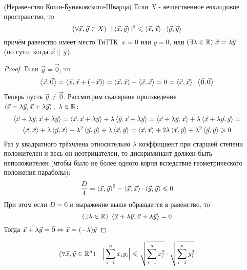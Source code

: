 \begin{theorem} (Неравенство Коши-Буняковского-Шварца) \label{Cauchy–Schwarz}
	Если $X$ - вещественное евклидовое пространство, то
	\[
		(\forall \vec{x}, \vec{y} \in X)\ \ 
		|\trbr{\vec{x}, \vec{y}}|^2 \le
		\trbr{\vec{x}, \vec{x}} \cdot
		\trbr{\vec{y}, \vec{y}}
	\]
	причём равенство имеет место ТиТТК $\ x = 0$ или $y = 0$, или
	$(\exists \lambda \in \mathbb{R})\ \vec{x} =
	\lambda \vec{y}\ $ (по сути, когда $\vec{x}\ ||\ \vec{y}$).
\end{theorem}

\begin{proof}
	Если $\vec{y} = \vec{0}$, то
	\[
		\left\langle\vec{x}, \vec{0}\right\rangle = \left\langle\vec{x},
		\vec{x} + (-\vec{x})\right\rangle = \left\langle\vec{x}, \vec{x}\right\rangle - 
		\left\langle\vec{x}, \vec{x}\right\rangle = 0 = \left\langle\vec{x}, \vec{x}\right\rangle
		\cdot \left\langle\vec{0}, \vec{0}\right\rangle
	\]
	Теперь пусть $\vec{y} \neq \vec{0}$.
	Рассмотрим скалярное произведение
	$\left\langle\vec{x} + \lambda \vec{y},
	\vec{x} + \lambda \vec{y}\right\rangle,\ \lambda \in \mathbb{R}$:
	\begin{multline*}
		\left\langle\vec{x} + \lambda \vec{y},
		\vec{x} + \lambda \vec{y}\right\rangle =
		\left\langle\vec{x}, \vec{x} + \lambda\vec{y}\right\rangle +
		\lambda\left\langle\vec{y}, \vec{x} + \lambda\vec{y}\right\rangle =
		\left\langle\vec{x} + \lambda\vec{y}, \vec{x}\right\rangle +
		\lambda\left\langle\vec{x} + \lambda\vec{y}, \vec{y}\right\rangle =
		\\
		\left\langle\vec{x}, \vec{x}\right\rangle + \lambda\left\langle\vec{y},
		\vec{x}\right\rangle + \lambda^2\left\langle\vec{y}, \vec{y}\right\rangle +
		\lambda\left\langle\vec{x}, \vec{y}\right\rangle =
		\left\langle\vec{x}, \vec{x}\right\rangle + 2\lambda
		\left\langle\vec{x}, \vec{y}\right\rangle +
		\lambda^2\left\langle\vec{y}, \vec{y}\right\rangle \geqslant 0
	\end{multline*}
	Раз у квадратного трёхчлена относительно $\lambda$
	коэффициент при старшей степени положителен и весь
	он неотрицателен, то дискриминант должен быть
	неположителен (чтобы было не более одного корня вследствие
	геометрического положения параболы):
	\[
		\frac{D}{4} = \left\langle\vec{x}, \vec{y}\right\rangle^2 -
		\left\langle\vec{x}, \vec{x}\right\rangle \cdot \left\langle\vec{y}, \vec{y}\right\rangle
		\leqslant 0
	\]
	При этом если $D = 0$ и выражение выше обращается в
	равенство, то 
	\[
		(\exists \lambda \in \R)\ 
		\trbr{\vec{x} + \lambda \vec{y},
		\vec{x} + \lambda \vec{y}} = 0
	\]
	Тогда
	$\vec{x} + \lambda\vec{y} = \vec{0} \Leftrightarrow \vec{x} =
	(-\lambda)\vec{y}$
\end{proof}

\begin{corollary}
	\[
		(\forall \vec{x}, \vec{y} \in \R^n)\ \ \ 
		\Big|\suml_{i = 1}^n x_i y_i\Big| \le
		\sqrt{\suml_{i = 1}^n x_i^2} \cdot
		\sqrt{\suml_{i = 1}^n y_i^2}
	\]
\end{corollary}

